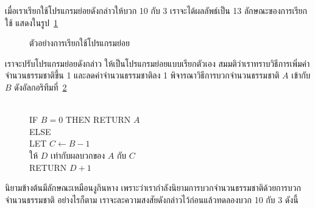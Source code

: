 เมื่อ{\wbr}เรา{\wbr}เรียก{\wbr}ใช้{\wbr}โปรแกรมย่อย{\wbr}ดังกล่าว{\wbr}ให้{\wbr}บวก 10 กับ 3 เรา{\wbr}จะ{\wbr}ได้{\wbr}ผลลัพธ์{\wbr}เป็น 13
ลักษณะ{\wbr}ของ{\wbr}การ{\wbr}เรียก{\wbr}ใช้ แสดง{\wbr}ใน{\wbr}รูป~\ref{rec:add-call}

\begin{figure}
\begin{center}
\end{center}
\caption{ตัวอย่าง{\wbr}การ{\wbr}เรียก{\wbr}ใช้{\wbr}โปรแกรมย่อย}
\label{rec:add-call}
\end{figure}

เรา{\wbr}จะ{\wbr}ปรับ{\wbr}โปรแกรมย่อย{\wbr}ดังกล่าว ให้{\wbr}เป็น{\wbr}โปรแกรมย่อย{\wbr}แบบ{\wbr}เรียก{\wbr}ตัวเอง{\wbr}
สมมติ{\wbr}ว่า{\wbr}เรา{\wbr}ทราบ{\wbr}วิธีการ{\wbr}เพิ่ม{\wbr}ค่า{\wbr}จำนวน{\wbr}ธรรมชาติ{\wbr}ขึ้น 1 และ{\wbr}ลด{\wbr}ค่า{\wbr}จำนวน{\wbr}ธรรมชาติ{\wbr}ลง 1
พิจารณา{\wbr}วิธีการ{\wbr}บวก{\wbr}จำนวน{\wbr}ธรรมชาติ $A$ เข้า{\wbr}กับ $B$
ดัง{\wbr}อัล{\wbr}กอ{\wbr}ริ{\wbr}ทึม{\wbr}ที่~\ref{algo:rec-int-add}

\begin{figure}
\begin{algt}
\label{algo:rec-int-add}
\\
\hspace*{0.2in} IF $B=0$ THEN RETURN $A$\\
\hspace*{0.2in} ELSE\\
\hspace*{0.2in}\hspace*{0.2in} LET $C\leftarrow B-1$\\
\hspace*{0.2in}\hspace*{0.2in} ให้ $D$ เท่า{\wbr}กับ{\wbr}ผลบวก{\wbr}ของ $A$ กับ $C$\\
\hspace*{0.2in}\hspace*{0.2in} RETURN $D+1$
\end{algt}
\end{figure}

นิยาม{\wbr}ข้างต้น{\wbr}มี{\wbr}ลักษณะ{\wbr}เหมือน{\wbr}งู{\wbr}กิน{\wbr}หาง{\wbr}
เพราะว่า{\wbr}เรา{\wbr}กำลัง{\wbr}นิยาม{\wbr}การ{\wbr}บวก{\wbr}จำนวน{\wbr}ธรรมชาติ{\wbr}ด้วย{\wbr}การ{\wbr}บวก{\wbr}จำนวน{\wbr}ธรรมชาติ อย่างไรก็ตาม{\wbr}
เรา{\wbr}จะ{\wbr}ละ{\wbr}ความ{\wbr}สงสัย{\wbr}ดังกล่าว{\wbr}ไว้{\wbr}ก่อน{\wbr}แล้ว{\wbr}ทดลอง{\wbr}บวก 10 กับ 3 ดังนี้{\wbr}

